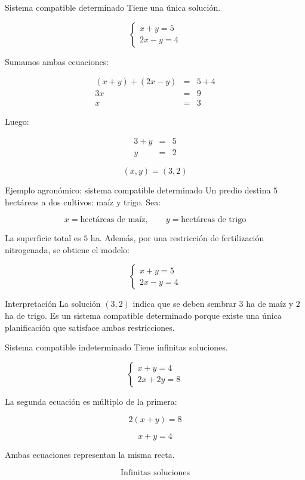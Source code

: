 \documentclass[aspectratio=169]{beamer}
\begin{document}
\begin{frame}{Sistema compatible determinado}
	Tiene una única solución.
	
	\[
	\begin{cases}
		x+y=5\\
		2x-y=4
	\end{cases}
	\]
	
	\smallskip
	
	Sumamos ambas ecuaciones:
	
\[
\begin{array}{rcl}
	(x+y)+(2x-y) &=& 5+4 \\[4pt]
	3x &=& 9 \\[4pt]
	x &=& 3
\end{array}
\]
	
	Luego:
	
	\[
	\begin{array}{rcl}
	3+y &=& 5 \\
	y &=& 2
	\end{array}
	\]
	
	\[
	\boxed{(x,y)=(3,2)}
	\]
\end{frame}

\begin{frame}{Ejemplo agronómico: sistema compatible determinado}
	\small
	Un predio destina \(5\) hectáreas a dos cultivos: maíz y trigo. Sea:
	
	\[
	x=\text{hectáreas de maíz}, \qquad y=\text{hectáreas de trigo}
	\]
	
	La superficie total es \(5\) ha. Además, por una restricción de fertilización nitrogenada, se obtiene el modelo:
	
	\[
	\begin{cases}
		x+y=5\\
		2x-y=4
	\end{cases}
	\]
	
	\begin{block}{Interpretación}
		La solución \((3,2)\) indica que se deben sembrar \(3\) ha de maíz y \(2\) ha de trigo. Es un sistema compatible determinado porque existe una única planificación que satisface ambas restricciones.
	\end{block}
\end{frame}
	
\begin{frame}{Sistema compatible indeterminado}
	Tiene infinitas soluciones.
	
	\[
	\begin{cases}
		x+y=4\\
		2x+2y=8
	\end{cases}
	\]
	
	La segunda ecuación es múltiplo de la primera:
	
	\[
	2(x+y)=8
	\]
	
	\[
	x+y=4
	\]
	
	\bigskip
	
	Ambas ecuaciones representan la misma recta.
	
	\[
	\boxed{\text{Infinitas soluciones}}
	\]
\end{frame}
\end{document}
